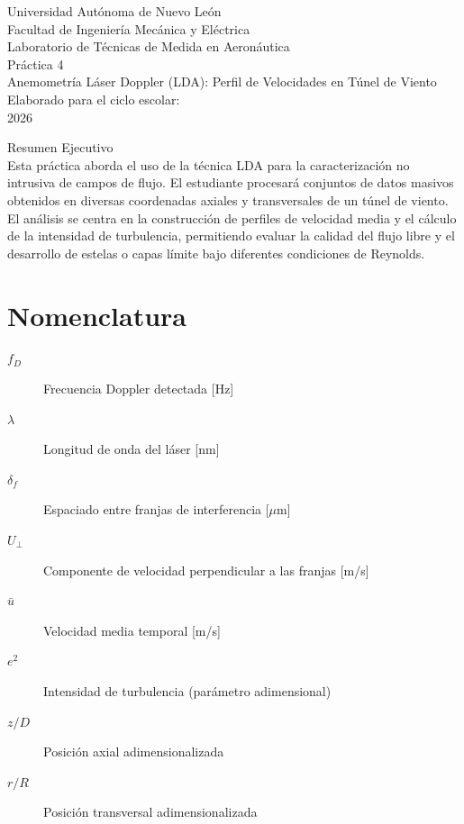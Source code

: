 \documentclass[11pt, a4paper]{article}
\begin{document}
\begin{titlepage}
    \centering
    {\LARGE Universidad Autónoma de Nuevo León}\\[0.5cm]
    {\Large Facultad de Ingeniería Mecánica y Eléctrica}\\[2cm]
    
    {\Large Laboratorio de Técnicas de Medida en Aeronáutica}\\[1cm]
    
    {\Huge Práctica 4}\\[0.5cm]
    {\Large Anemometría Láser Doppler (LDA): Perfil de Velocidades en Túnel de Viento}\\[2cm]
    
    Elaborado para el ciclo escolar:\\
    2026\\[2cm]
    
    \vfill
    
    Resumen Ejecutivo\\
    Esta práctica aborda el uso de la técnica LDA para la caracterización no intrusiva de campos de flujo. El estudiante procesará conjuntos de datos masivos obtenidos en diversas coordenadas axiales y transversales de un túnel de viento. El análisis se centra en la construcción de perfiles de velocidad media y el cálculo de la intensidad de turbulencia, permitiendo evaluar la calidad del flujo libre y el desarrollo de estelas o capas límite bajo diferentes condiciones de Reynolds.
\end{titlepage}

\tableofcontents
\newpage

\section*{Nomenclatura}
\begin{description}
    \item[$f_D$] Frecuencia Doppler detectada [Hz]
    \item[$\lambda$] Longitud de onda del láser [nm]
    \item[$\delta_f$] Espaciado entre franjas de interferencia [$\mu$m]
    \item[$U_\perp$] Componente de velocidad perpendicular a las franjas [m/s]
    \item[$\bar{u}$] Velocidad media temporal [m/s]
    \item[$e^2$] Intensidad de turbulencia (parámetro adimensional)
    \item[$z/D$] Posición axial adimensionalizada
    \item[$r/R$] Posición transversal adimensionalizada
\end{description}
\end{document}
